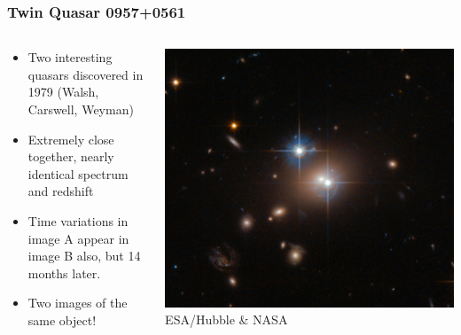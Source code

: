 \documentclass{beamer}
\begin{document}
\frame
{
    \frametitle{Twin Quasar 0957+0561}

    \begin{columns}
        \begin{column}{0.5\textwidth}    
            \begin{itemize}

                \item Two interesting quasars discovered in 1979 (Walsh, Carswell, Weyman)

                \item Extremely close together, nearly identical spectrum and redshift

                \item Time variations in image A appear in image B also, but 14 months later.

                \item Two images of the same object!
                    
            \end{itemize}
        \end{column}
        \begin{column}{0.5\textwidth}
            \begin{center}
                \includegraphics[width=\textwidth]{QSO_B0957+0561-crop.jpg}
                \newline
                {\tiny ESA/Hubble \& NASA}
            \end{center}
        \end{column}
    \end{columns}
}
\end{document}
